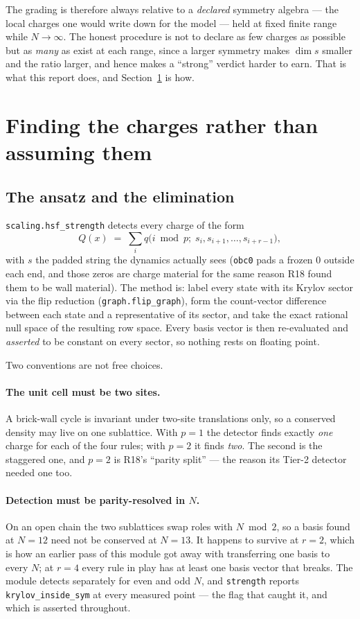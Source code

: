 \documentclass[11pt]{article}
\newcommand{\rt}[1]{\texttt{#1}}
\newcommand{\fn}[1]{\texttt{#1}}
\theoremstyle{plain}
\begin{document}
The grading is therefore always relative to a \emph{declared} symmetry algebra
--- the local charges one would write down for the model --- held at fixed
finite range while $N\to\infty$. The honest procedure is not to declare as few
charges as possible but as \emph{many} as exist at each range, since a larger
symmetry makes $\dim s$ smaller and the ratio larger, and hence makes a
``strong'' verdict harder to earn. That is what this report does, and
Section~\ref{sec:detector} is how.

\section{Finding the charges rather than assuming them}
\label{sec:detector}

\subsection{The ansatz and the elimination}

\fn{scaling.hsf\_strength} detects every charge of the form
\[
Q(x) \;=\; \sum_i q\bigl(i \bmod p;\; s_i, s_{i+1}, \ldots, s_{i+r-1}\bigr),
\]
with $s$ the padded string the dynamics actually sees (\rt{obc0} pads a frozen
$0$ outside each end, and those zeros are charge material for the same reason
R18 found them to be wall material). The method is: label every state with its
Krylov sector via the flip reduction (\fn{graph.flip\_graph}), form the
count-vector difference between each state and a representative of its sector,
and take the exact rational null space of the resulting row space. Every basis
vector is then re-evaluated and \emph{asserted} to be constant on every sector,
so nothing rests on floating point.

Two conventions are not free choices.

\paragraph{The unit cell must be two sites.} A brick-wall cycle is invariant
under two-site translations only, so a conserved density may live on one
sublattice. With $p=1$ the detector finds exactly \emph{one} charge for each of
the four rules; with $p=2$ it finds \emph{two}. The second is the staggered one,
and $p=2$ is R18's ``parity split'' --- the reason its Tier-2 detector needed
one too.

\paragraph{Detection must be parity-resolved in $N$.} On an open chain the two
sublattices swap roles with $N \bmod 2$, so a basis found at $N=12$ need not be
conserved at $N=13$. It happens to survive at $r=2$, which is how an earlier
pass of this module got away with transferring one basis to every $N$; at
$r=4$ every rule in play has at least one basis vector that breaks. The module
detects separately for even and odd $N$, and \fn{strength} reports
\rt{krylov\_inside\_sym} at every measured point --- the flag that caught it,
and which is asserted throughout.
\end{document}
